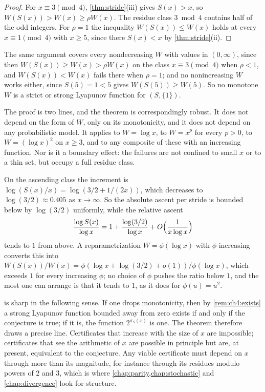 \begin{proof}
For $x\equiv3\pmod4$, \cref{thm:stride}(iii) gives $S(x)>x$, so
$W(S(x))>W(x)\ge\rho W(x)$.  The residue class $3\bmod4$ contains half of the
odd integers.
For $\rho=1$ the inequality $W(S(x))\le W(x)$ holds at every $x\equiv1\pmod4$ with $x\ge5$, since there $S(x)<x$ by \cref{thm:stride}(ii).
\end{proof}

The same argument covers every nondecreasing $W$ with values in $(0,\infty)$, since then $W(S(x))\ge W(x)>\rho W(x)$ on the class $x\equiv3\pmod4$ when $\rho<1$, and $W(S(x))<W(x)$ fails there when $\rho=1$; and no nonincreasing $W$ works either, since $S(5)=1<5$ gives $W(S(5))\ge W(5)$. So no monotone $W$ is a strict or strong Lyapunov function for $(S,\{1\})$.

The proof is two lines, and the theorem is correspondingly robust.  It does
not depend on the form of $W$, only on its monotonicity, and it does not
depend on any probabilistic model.  It applies to $W=\log x$, to $W=x^p$ for
every $p>0$, to $W=(\log x)^2$ on $x\ge3$, and to any composite of these with
an increasing function.  Nor is it a boundary effect: the failures are not
confined to small $x$ or to a thin set, but occupy a full residue class.

\begin{remark}\label{rem:ch4:ascentrate}
On the ascending class the increment is
$\log(S(x)/x)=\log(3/2+1/(2x))$, which decreases to $\log(3/2)\approx0.405$
as $x\to\infty$.  So the absolute ascent per stride is bounded below by
$\log(3/2)$ uniformly, while the relative ascent
\[
  \frac{\log S(x)}{\log x}=1+\frac{\log(3/2)}{\log x}+O\Bigl(\frac{1}{x\log x}\Bigr)
\]
tends to $1$ from above.  A reparametrization $W=\phi(\log x)$ with $\phi$
increasing converts this into $W(S(x))/W(x)=\phi(\log x+\log(3/2)+o(1))/\phi(\log x)$,
which exceeds $1$ for every increasing $\phi$; no choice of $\phi$ pushes the
ratio below $1$, and the most one can arrange is that it tends to $1$, as it
does for $\phi(u)=u^2$.
\end{remark}

\begin{remark}\label{rem:ch4:monotone}
 is sharp in the following sense.  If one drops
monotonicity, then by \cref{rem:ch4:exists} a strong Lyapunov function bounded
away from zero exists if and only if the conjecture is true; if it is, the function $2^{\sigma_S(x)}$ is one.
The theorem therefore draws a precise line.  Certificates that increase with the
size of $x$ are impossible; certificates that see the arithmetic of $x$ are
possible in principle but are, at present, equivalent to the conjecture.  Any
viable certificate must depend on $x$ through more than its magnitude, for
instance through its residues modulo powers of $2$ and $3$, which is where
\cref{chap:parity,chap:stochastic} and \cref{chap:divergence} look for
structure.
\end{remark}

